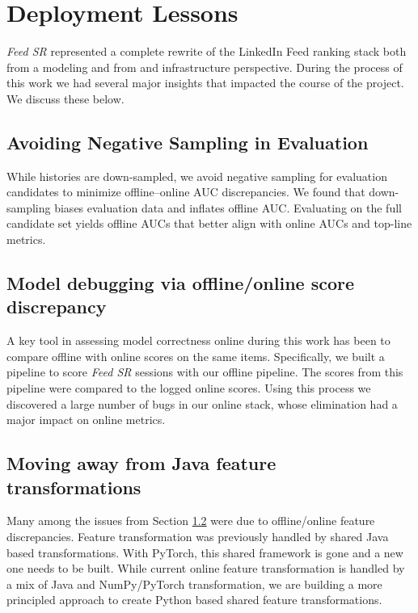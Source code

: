 \documentclass[sigconf]{acmart}
\newcommand{\systemname}{\textit{Feed SR}}
\begin{document}
 
\section{Deployment Lessons}

{\systemname} represented a complete rewrite of the LinkedIn Feed ranking stack both from a modeling and from and infrastructure perspective. During the process of this work we had several major insights that impacted the course of the project. We discuss these below.

\subsection{Avoiding Negative Sampling in Evaluation}
While histories are down-sampled, we avoid negative sampling for evaluation candidates to minimize offline–online AUC discrepancies. We found that down-sampling biases evaluation data and inflates offline AUC. Evaluating on the full candidate set yields offline AUCs that better align with online AUCs and top-line metrics.


\subsection{Model debugging via offline/online score discrepancy}\label{sec:offline-online-discrepancy}
A key tool in assessing model correctness online during this work has been to compare offline with online scores on the same items. Specifically, we built a pipeline to score {\systemname} sessions with our offline pipeline. The scores from this pipeline were compared to the logged online scores. Using this process we discovered a large number of bugs in our online stack, whose elimination had a major impact on online metrics.


\subsection{Moving away from Java feature transformations}
Many among the issues from Section \ref{sec:offline-online-discrepancy} were due to offline/online feature discrepancies. Feature transformation was previously handled by shared Java based transformations. With PyTorch, this shared framework is gone and a new one needs to be built. While current online feature transformation is handled by a mix of Java and NumPy/PyTorch transformation, we are building a more principled approach to create Python based shared feature transformations.
\end{document}

